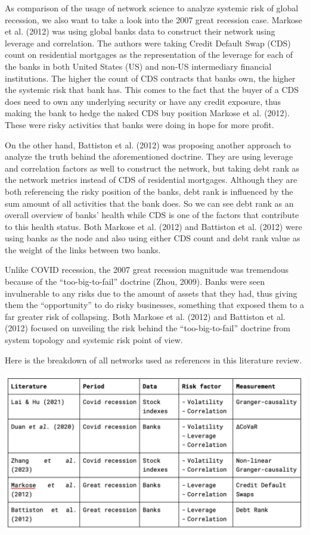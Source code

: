 \documentclass[a4paper,11pt]{article}
\begin{document}
As comparison of the usage of network science to analyze systemic risk of global recession, we also want to take a look into the 2007 great recession case. Markose et al. (2012) was using global banks data to construct their network using leverage and correlation. The authors were taking Credit Default Swap (CDS) count on residential mortgages as the representation of the leverage for each of the banks in both United States (US) and non-US intermediary financial institutions. The higher the count of CDS contracts that banks own, the higher the systemic risk that bank has. This comes to the fact that the buyer of a CDS does need to own any underlying security or have any credit exposure, thus making the bank to hedge the naked CDS buy position Markose et al. (2012). These were risky activities that banks were doing in hope for more profit.

On the other hand, Battiston et al. (2012) was proposing another approach to analyze the truth behind the aforementioned doctrine. They are using leverage and correlation factors as well to construct the network, but taking debt rank as the network metrics instead of CDS of residential mortgages. Although they are both referencing the risky position of the banks, debt rank is influenced by the sum amount of all activities that the bank does. So we can see debt rank as an overall overview of banks’ health while CDS is one of the factors that contribute to this health status. Both Markose et al. (2012) and Battiston et al. (2012) were using banks as the node and also using either CDS count and debt rank value as the weight of the links between two banks.

Unlike COVID recession, the 2007 great recession magnitude was tremendous because of the “too-big-to-fail” doctrine (Zhou, 2009). Banks were seen invulnerable to any risks due to the amount of assets that they had, thus giving them the “opportunity” to do risky businesses, something that exposed them to a far greater risk of collapsing. Both Markose et al. (2012) and Battiston et al. (2012) focused on unveiling the risk behind the “too-big-to-fail” doctrine from system topology and systemic risk point of view.

Here is the breakdown of all networks used as references in this literature review.

\includegraphics[scale=0.6]{network_comparison_1.png}
\end{document}
